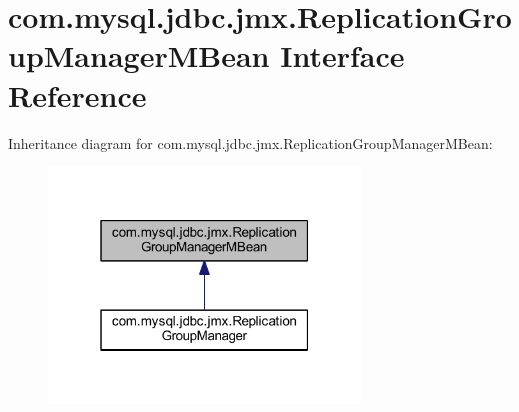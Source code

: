\hypertarget{interfacecom_1_1mysql_1_1jdbc_1_1jmx_1_1_replication_group_manager_m_bean}{}\section{com.\+mysql.\+jdbc.\+jmx.\+Replication\+Group\+Manager\+M\+Bean Interface Reference}
\label{interfacecom_1_1mysql_1_1jdbc_1_1jmx_1_1_replication_group_manager_m_bean}


Inheritance diagram for com.\+mysql.\+jdbc.\+jmx.\+Replication\+Group\+Manager\+M\+Bean\+:
\nopagebreak
\begin{figure}[H]
\begin{center}
\leavevmode
\includegraphics[width=235pt]{interfacecom_1_1mysql_1_1jdbc_1_1jmx_1_1_replication_group_manager_m_bean__inherit__graph}
\end{center}
\end{figure}
